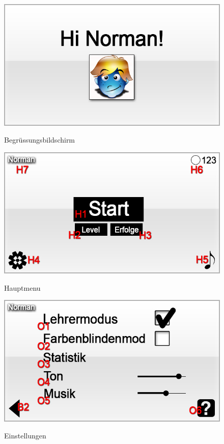 \begin{figure}[H]
\centering
{}\label{fig:Welcome}
\includegraphics[scale=0.55]{../gui/_jpeg_numeration/welcome.jpg}
\caption{Begrüssungsbildschirm}
\end{figure}

\begin{figure}[H]
\centering
{}\label{fig:Hauptmenu}
\includegraphics[scale=0.55]{../gui/_jpeg_numeration/main_manu.jpg}
\caption{Hauptmenu}
\end{figure}

\begin{figure}[H]
\centering
{}\label{fig:Einstellungen}
\includegraphics[scale=0.55]{../gui/_jpeg_numeration/settings.jpg}
\caption{Einstellungen}
\end{figure}

